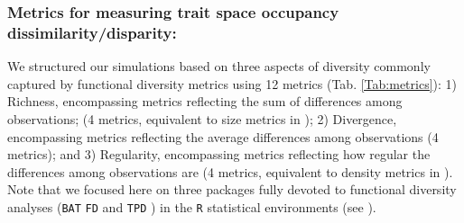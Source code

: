 \documentclass[12pt,letterpaper]{article}
\begin{document}
\subsubsection{Metrics for measuring trait space occupancy dissimilarity/disparity:}

We structured our simulations based on three aspects of diversity commonly captured by functional diversity metrics \citep{mammola2021concepts} using 12 metrics (Tab. \ref{Tab:metrics}):
1) Richness, encompassing metrics reflecting the sum of differences among observations; (4 metrics, equivalent to size metrics in \citealt{guillerme2020shifting});
2) Divergence, encompassing metrics reflecting the average differences among observations (4 metrics); and
3) Regularity, encompassing metrics reflecting how regular the differences among observations are (4 metrics, equivalent to density metrics in \citealt{guillerme2020shifting}).
Note that we focused here on three packages fully devoted to functional diversity analyses (\texttt{BAT} \citealt{cardoso2015bat} \texttt{FD} \citealt{Laliberte2010FD} and \texttt{TPD} \citealt{carmona2019trait}) in the \texttt{R} statistical environments (see \citealt{mammola2021concepts}).
\end{document}
